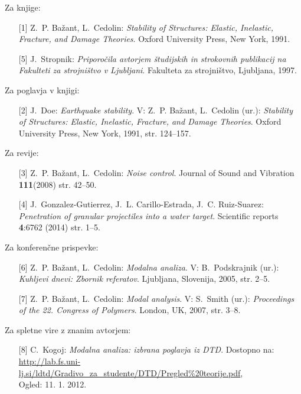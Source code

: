 Za knjige:
\begin{itemize}
	\item[{[1]}] Z.~P. Ba\v{z}ant, L.~Cedolin: \emph{Stability of Structures: Elastic,
		Inelastic, Fracture, and Damage Theories}. Oxford University Press, New York,
	1991.
	\item[{[5]}] J.~Stropnik: \emph{Priporočila avtorjem študijskih in strokovnih publikacij
		na Fakulteti za strojništvo v Ljubljani}. Fakulteta za strojništvo,
	Ljubljana, 1997.
\end{itemize}

Za poglavja v knjigi:
\begin{itemize}
	\item[{[2]}] J.~Doe: \emph{Earthquake stability}. V: Z.~P. Ba\v{z}ant, L.~Cedolin (ur.):
	\emph{Stability of Structures: Elastic, Inelastic, Fracture, and Damage
		Theories}. Oxford University Press, New York, 1991, str. 124--157.
\end{itemize}

Za revije:
\begin{itemize}
	\item[{[3]}] Z.~P. Ba\v{z}ant, L.~Cedolin: \emph{Noise control}. Journal of Sound and
	Vibration \textbf{111}(2008) str. 42--50.
	\item[{[4]}] J.~Gonzalez-Gutierrez, J.~L. Carillo-Estrada, J.~C. Ruiz-Suarez:
	\emph{Penetration of granular projectiles into a water target}. Scientific
	reports \textbf{4}:6762 (2014) str. 1--5.
\end{itemize}

Za konferenčne prispevke:
\begin{itemize}
	\item[{[6]}] Z.~P. Ba\v{z}ant, L.~Cedolin: \emph{Modalna analiza}. V: B.~Podskrajnik (ur.):
	\emph{Kuhljevi dnevi: Zbornik referatov}. Ljubljana, Slovenija, 2005, str.
	2--5.
	\item[{[7]}] Z.~P. Ba\v{z}ant, L.~Cedolin: \emph{Modal analysis}. V: S.~Smith (ur.):
	\emph{Proceedings of the 22. Congress of Polymers}. London, UK, 2007, str.
	3--8.
\end{itemize}

Za spletne vire z znanim avtorjem:
\begin{itemize}
	\item[{[8]}] C.~Kogoj: \emph{Modalna analiza: izbrana poglavja iz {DTD}}. Dostopno na:
	\url{http://lab.fs.uni-lj.si/ldtd/Gradivo_za_studente/DTD/Pregled\%20teorije.pdf},\\
	Ogled: 11. 1. 2012.
\end{itemize}

